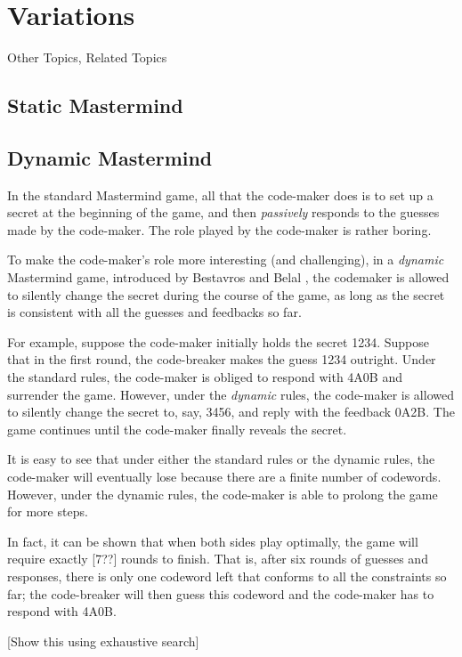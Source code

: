 \chapter{Variations}

Other Topics, Related Topics

\section{Static Mastermind}

\section{Dynamic Mastermind}

In the standard Mastermind game, all that the code-maker does is to set up a secret at the beginning of the game, and then \emph{passively} responds to the guesses made by the code-maker. The role played by the code-maker is rather boring.

To make the code-maker's role more interesting (and challenging), in a \emph{dynamic} Mastermind game, introduced by Bestavros and Belal \cite{bestavros86}, the codemaker is allowed to silently change the secret during the course of the game, as long as the secret is consistent with all the guesses and feedbacks so far. 

For example, suppose the code-maker initially holds the secret 1234. Suppose that in the first round, the code-breaker makes the guess 1234 outright. Under the standard rules, the code-maker is obliged to respond with 4A0B and surrender the game. However, under the \emph{dynamic} rules, the code-maker is allowed to silently change the secret to, say, 3456, and reply with the feedback 0A2B. The game continues until the code-maker finally reveals the secret.

It is easy to see that under either the standard rules or the dynamic rules, the code-maker will eventually lose because there are a finite number of codewords. However, under the dynamic rules, the code-maker is able to prolong the game for more steps. 

In fact, it can be shown that when both sides play optimally, the game will require exactly [7??] rounds to finish. That is, after six rounds of guesses and responses, there is only one codeword left that conforms to all the constraints so far; the code-breaker will then guess this codeword and the code-maker has to respond with 4A0B.

[Show this using exhaustive search]

